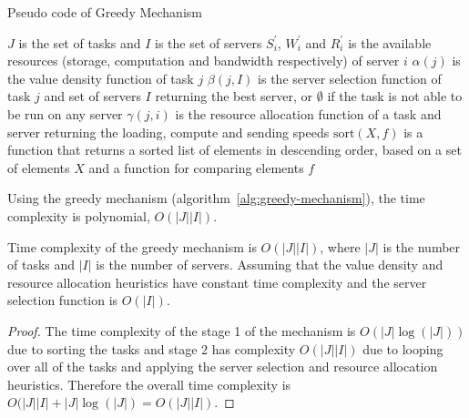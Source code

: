 \begin{algorithm}
    \caption{Pseudo code of Greedy Mechanism}
    \label{alg:greedy-mechanism}
    \begin{algorithmic}
        \REQUIRE $J$ is the set of tasks and $I$ is the set of servers
        \REQUIRE $S^{'}_i$, $W^{'}_i$ and $R^{'}_i$ is the available resources (storage, computation and bandwidth respectively) of server $i$
        \REQUIRE $\alpha(j)$ is the value density function of task $j$
        \REQUIRE $\beta(j, I)$ is the server selection function of task $j$ and set of servers $I$ returning the best server, or $\emptyset$ if the task is not able to be run on any server
        \REQUIRE $\gamma(j, i)$ is the resource allocation function of a task and server returning the loading, compute and sending speeds
        \REQUIRE $\text{sort}(X, f)$ is a function that returns a sorted list of elements in descending order, based on a set of elements $X$ and a function for comparing elements $f$

        \ENDIF
        \ENDFOR
    \end{algorithmic}
\end{algorithm}

Using the greedy mechanism (algorithm~\ref{alg:greedy-mechanism}), the time complexity is polynomial,
$O(\left|J\right| \left|I\right|)$.
\begin{theorem}
    Time complexity of the greedy mechanism is $O(\left|J\right| \left|I\right|)$, where $\left|J\right|$ is the number
    of tasks and $\left|I\right|$ is the number of servers. Assuming that the value density and resource allocation
    heuristics have constant time complexity and the server selection function is $O(\left|I\right|)$.
\end{theorem}
\begin{proof}
    The time complexity of the stage 1 of the mechanism is $O(\left|J\right| \log(\left|J\right|))$ due to sorting the
    tasks and stage 2 has complexity $O(\left|J\right| \left|I\right|)$ due to looping over all of the tasks and
    applying the server selection and resource allocation heuristics. Therefore the overall time complexity is
    $O(\left|J\right| \left|I\right| + \left|J\right| \log(\left|J\right|) = O(\left|J\right| \left|I\right|)$.
\end{proof}

